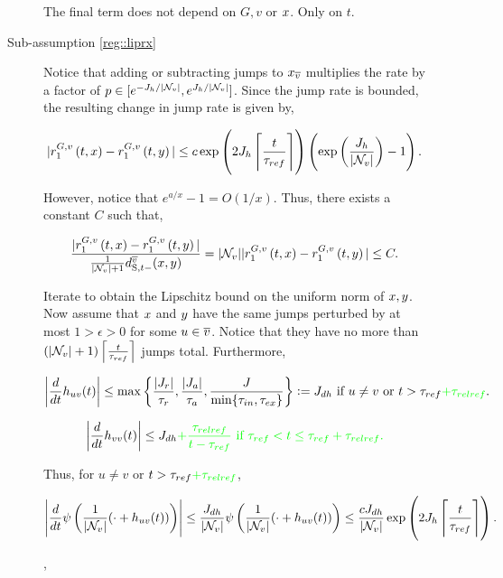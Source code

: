 \begin{description}
\begin{description}
The final term does not depend on \(G,v\) or \(x\). Only on \(t\).

\item[Sub-assumption \ref{reg::liprx}] 

Notice that adding or subtracting jumps to \(x_{\overline{v}}\) multiplies the rate by a factor of \(p \in [e^{-J_h/|\mathcal{N}_{v}|},e^{J_h/|\mathcal{N}_{v}|}]\). Since the jump rate is bounded, the resulting change in jump rate is given by,

\[|\rate\gvpara{G}{v}\stpara{1}\tmepro{t}{\xf}{} - \rate\gvpara{G}{v}\stpara{1}\tmepro{t}{\xg}{}| \leq c\exp\left(2J_h\left\lceil\frac{t}{\tau_{ref}}\right\rceil\right)\left(\exp\left(\frac{J_h}{|\neigh{v}|}\right)-1\right).\]

However, notice that \(e^{a/x} - 1 = O(1/x)\). Thus, there exists a constant \(C\) such that,

\[\frac{|\rate\gvpara{G}{v}\stpara{1}\tmepro{t}{\xf}{} - \rate\gvpara{G}{v}\stpara{1}\tmepro{t}{\xg}{}|}{\frac{1}{|\neigh{v}|+1}\stmet{t-}^{\cl{v}}(\xf,\xg)} = |\neigh{v}||\rate\gvpara{G}{v}\stpara{1}\tmepro{t}{\xf}{} - \rate\gvpara{G}{v}\stpara{1}\tmepro{t}{\xg}{}| \leq C.\]

Iterate to obtain the Lipschitz bound on the uniform norm of \(x,y\). Now assume that \(x\) and \(y\) have the same jumps perturbed by at most \(1 > \epsilon > 0\) for some \(u \in \overline{v}\). Notice that they have no more than \((|\mathcal{N}_{v}|+1)\left\lceil\frac{t}{\tau_{ref}}\right\rceil\) jumps total. Furthermore, 

\[\left|\frac{d}{dt} h_{uv}(t)\right| \leq \max\left\{\frac{|J_r|}{\tau_r},\frac{|J_a|}{\tau_a},\frac{J}{\min\{\tau_{in},\tau_{ex}\}}\right\} := J_{dh}\text{ if } u\neq v\text{ or } t > \tau_{ref}\textcolor{green}{+\tau_{relref}}.\]

\[\left|\frac{d}{dt} h_{vv}(t)\right| \leq J_{dh}\textcolor{green}{+\frac{\tau_{relref}}{t-\tau_{ref}}\text{ if } \tau_{ref} < t\leq \tau_{ref}+\tau_{relref}.}\]

Thus, for \(u\neq v\) or \(t > \tau_{ref}\textcolor{green}{+\tau_{relref}}\),

\[\left|\frac{d}{dt}\psi\left(\frac{1}{|\mathcal{N}_{v}|} (\cdot + h_{uv}(t))\right)\right| \leq \frac{J_{dh}}{|\mathcal{N}_{v}|}\psi\left(\frac{1}{|\mathcal{N}_{v}|} (\cdot + h_{uv}(t))\right) \leq \frac{cJ_{dh}}{|\mathcal{N}_{v}|}\exp\left(2J_h\left\lceil\frac{t}{\tau_{ref}}\right\rceil\right).\]

,


\end{description}
\end{description}
